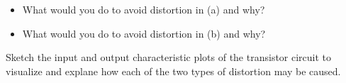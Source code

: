 \begin{enumerate}

  \begin{itemize}
  \item What would you do to avoid distortion in (a) and why? 
  \item What would you do to avoid distortion in (b) and why? 
  \end{itemize}
  Sketch the input and output characteristic plots of the transistor
  circuit to visualize and explane how each of the two types of distortion 
  may be caused.





  \begin{comment}
  {\bf Solution:}

  \begin{itemize}
  \item Reduce $R_B$, and/or increase $V_{cc}$.
  \item Increase $V_{cc}$ and/or reduce $R_C$ and/or increase $R_B$.
  \end{itemize}


\item {\bf Problem 3 (25 points)} 

The circuit below shows a simple means for obtaining improved bias
stability of the DC operating point of the transistor. As always,
assume $V_{BE}=0.7V$ when answering the following questions.

\htmladdimg{../midterm3e.gif}

\begin{itemize}
\item Explain qualitatively what happens if $I_C$ tends to rise as a
  result of an increased $\beta$.
\item Derive an expression for $I_C$ in terms of $R_B$, $R_C$, $\beta$
  and $V_{CC}$.
\item Find an approximation of the expression of $I_C$ when $\beta$ is 
  large enough, so that $I_C$ independent of $\beta$. In this case, how 
  are $R_C$ and $R_B$ related?
\item Find $R_C$ and $R_B$ so that the DC operating point is $V_{CE}=5V$ 
and $I_C=2mA$, when $\beta=100$ and $V_{CC}=10V$. 
\item Find $V_{CE}$ and $I_C$ for $\beta=50$, $\beta=100$, and $\beta=200$
	based on the resistances found above.
\end{itemize}

\item {\bf Problem 3. (30 points)} 


\end{comment}
\end{enumerate}
